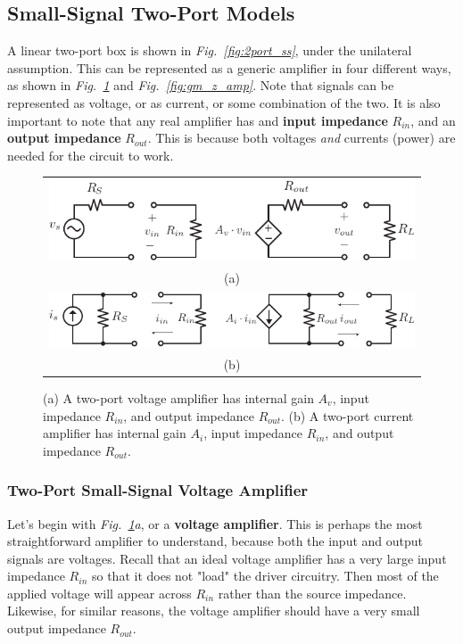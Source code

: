 \subsection{Small-Signal Two-Port Models}
A linear two-port box is shown in \emph{Fig.~\ref{fig:2port_ss}}, under the unilateral assumption.  This can be represented as a generic amplifier in four different ways, as shown in \emph{Fig.~\ref{fig:vi_amp}} and \emph{Fig.~\ref{fig:gm_z_amp}}.  Note that signals can be represented as voltage, or as current, or some combination of the two.  It is also important to note that any real amplifier has and \textbf{input impedance} $R_{in}$, and an \textbf{output impedance} $R_{out}$.  This is because both voltages \textit{and} currents (power) are needed for the circuit to work.
\newpage
\begin{figure}[tb]
\centering
\begin{tabular}{c}
\includegraphics[width=.9\columnwidth]{vamp_label}\\
(a)\\
\includegraphics[width=.9\columnwidth]{iamp}\\
(b)\\
\end{tabular}
\caption{(a) A two-port voltage amplifier has internal gain $A_v$, input impedance $R_{in}$, and output impedance $R_{out}$.  (b) A two-port current amplifier has internal gain $A_i$, input impedance $R_{in}$, and output impedance $R_{out}$.}
\label{fig:vi_amp}
\end{figure}
\subsubsection{Two-Port Small-Signal Voltage Amplifier}
Let's begin with \emph{Fig.~\ref{fig:vi_amp}a}, or a \textbf{voltage amplifier}.  This is perhaps the most straightforward amplifier to understand, because both the input and output signals are voltages.  Recall that an ideal voltage amplifier has a very large input impedance $R_{in}$ so that it does not "load" the driver circuitry. Then most of the applied voltage will appear across $R_{in}$ rather than the source impedance.  Likewise, for similar reasons, the voltage amplifier should have a very small output impedance $R_{out}$.
